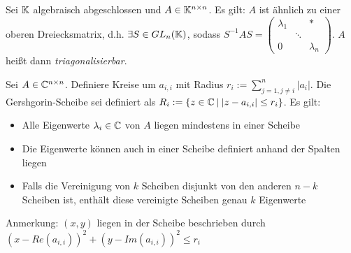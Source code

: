\begin{satz}
	Sei $\mathbb{K}$ algebraisch abgeschlossen und $A \in \mathbb{K}^{n \times n}$. Es gilt: $A$ ist ähnlich zu einer oberen Dreiecksmatrix, d.h. $\exists S \in GL_n(\mathbb{K})$, sodass $S^{-1} A S = \left( \begin{smallmatrix} 
	\lambda_1 & & * \\
	& \ddots & \\
	0 & & \lambda_n
	\end{smallmatrix} \right)$. $A$ heißt dann \emph{triagonalisierbar}.
\end{satz}

\begin{satz}
	Sei $A \in \mathbb{C}^{n \times n}$. Definiere Kreise um $a_{i,i}$ mit Radius $r_i := \sum_{j = 1, j \neq i}^n |a_i|$. Die Gershgorin-Scheibe sei definiert als $R_i := \{z \in \mathbb{C} \medspace | \medspace |z -a_{i,i}| \leq r_i\}$. Es gilt:\begin{itemize}[noitemsep]
		\item Alle Eigenwerte $\lambda_i \in \mathbb{C} $ von $A$ liegen mindestens in einer Scheibe
		\item Die Eigenwerte können auch in einer Scheibe definiert anhand der Spalten liegen
		\item Falls die Vereinigung von $k$ Scheiben disjunkt von den anderen $n-k$ Scheiben ist, enthält diese vereinigte Scheiben genau $k$ Eigenwerte
	\end{itemize}

	Anmerkung: $(x,y)$ liegen in der Scheibe beschrieben durch $(x - Re(a_{i,i}))^2 + (y - Im(a_{i,i}))^2 \leq r_i$
\end{satz}


